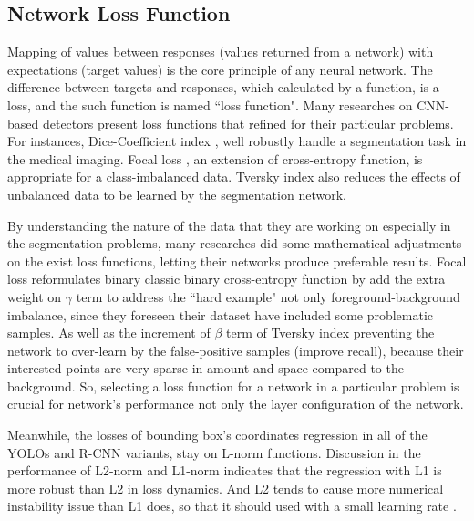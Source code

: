 \documentclass[default,pdflatex,iicol]{sn-jnl}%
\begin{document}
\subsection{Network Loss Function}\label{review_loss}
Mapping of values between responses (values returned from a network) with expectations (target values) is the core principle of any neural network. The difference  between targets and responses, which calculated by a function, is a loss, and the such function is named ``loss function". Many researches on CNN-based detectors present loss functions that refined for their particular problems. For instances, Dice-Coefficient index \cite{vnet, gendice}, well robustly handle a segmentation task in the medical imaging. Focal loss \cite{focalloss1}, an extension of cross-entropy function, is appropriate for a class-imbalanced data. Tversky index \cite{tverskyloss} also reduces the effects of unbalanced data to be learned by the segmentation network.

By understanding the nature of the data that they are working on especially in the segmentation problems, many researches did some mathematical adjustments on the exist loss functions, letting their networks produce preferable results. Focal loss \cite{focalloss1} reformulates binary classic binary cross-entropy function by add the extra weight on $\gamma$ term to address the ``hard example" not only foreground-background imbalance, since they foreseen their dataset have included some problematic samples. As well as the increment of $\beta$ term of Tversky index \cite{tverskyloss} preventing the network to over-learn by the false-positive samples (improve recall), because their interested points are very sparse in amount and space compared to the background. So, selecting a loss function for a network in a particular problem is crucial for network's performance not only the layer configuration of the network.

Meanwhile, the losses of bounding box's coordinates regression in all of the YOLOs and R-CNN variants, stay on L-norm functions. Discussion in the performance of L2-norm and L1-norm indicates that the regression with L1 is more robust than L2 in loss dynamics. And L2 tends to cause more numerical instability issue than L1 does, so that it should used with a small learning rate \cite{fastrcnn}.
\end{document}
